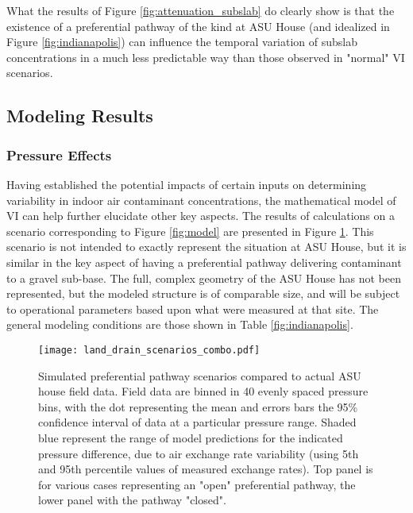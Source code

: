 \documentclass[preprint,12pt]{elsarticle}
\begin{document}
What the results of Figure \ref{fig:attenuation_subslab} do clearly show is that the existence of a preferential pathway of the kind at ASU House (and idealized in Figure \ref{fig:indianapolis}) can influence the temporal variation of subslab concentrations in a much less predictable way than those observed in "normal" VI scenarios.\par

\subsection{Modeling Results}\label{s:results_model}

\subsubsection{Pressure Effects}\label{s:results_model_pressure}

Having established the potential impacts of certain inputs on determining variability in indoor air contaminant concentrations, the mathematical model of VI can help further elucidate other key aspects.
The results of calculations on a scenario corresponding to Figure \ref{fig:model} are presented in Figure \ref{fig:land_drain_scenarios}.
This scenario is not intended to exactly represent the situation at ASU House, but it is similar in the key aspect of having a preferential pathway delivering contaminant to a gravel sub-base.
The full, complex geometry of the ASU House has not been represented, but the modeled structure is of comparable size, and will be subject to operational parameters based upon what were measured at that site.
The general modeling conditions are those shown in Table \ref{fig:indianapolis}.\par

\begin{figure}[htb!]
 \centering
 \texttt{[image: land\_drain\_scenarios\_combo.pdf]}
 \caption{Simulated preferential pathway scenarios compared to actual ASU house field data. Field data are binned in 40 evenly spaced pressure bins, with the dot representing the mean and errors bars the 95\% confidence interval of data at a particular pressure range. Shaded blue represent the range of model predictions for the indicated pressure difference, due to air exchange rate variability (using 5th and 95th percentile values of measured exchange rates). Top panel is for various cases representing an "open" preferential pathway, the lower panel with the pathway "closed".}\label{fig:land_drain_scenarios}
\end{figure}
\end{document}
